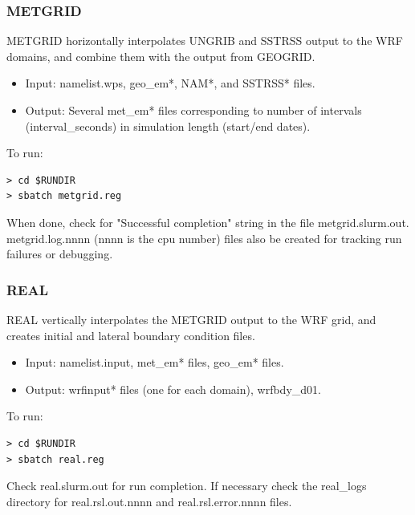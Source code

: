 \begin{frame}[fragile]\frametitle{METGRID}

\footnotesize{
METGRID horizontally interpolates UNGRIB and SSTRSS output to the WRF domains, and combine them with the output from GEOGRID.
\begin{itemize}
\item Input: namelist.wps, geo\_em*, NAM*, and SSTRSS* files.
\item Output: Several met\_em* files corresponding to number of intervals (interval\_seconds) in simulation length (start/end dates).
\end{itemize}
}    
\hrulefill\par
\footnotesize{To run:}
\begin{lstlisting}
> cd $RUNDIR
> sbatch metgrid.reg
\end{lstlisting}
When done, check for  "Successful completion" string in the file metgrid.slurm.out. metgrid.log.nnnn (nnnn is the cpu number) files also be created for tracking run failures or debugging.


\end{frame}

\begin{frame}[fragile]\frametitle{REAL}

\footnotesize{
REAL vertically interpolates the METGRID output to the WRF grid, and creates initial and lateral boundary condition files.
\begin{itemize}
\item Input: namelist.input, met\_em*  files, geo\_em* files.
\item Output: wrfinput* files (one for each domain), wrfbdy\_d01.
\end{itemize}
}    
\hrulefill\par
\footnotesize{To run:}
\begin{lstlisting}
> cd $RUNDIR
> sbatch real.reg
\end{lstlisting}
Check real.slurm.out for run completion.
If necessary check the real\_logs directory for real.rsl.out.nnnn and real.rsl.error.nnnn files.


\end{frame}


